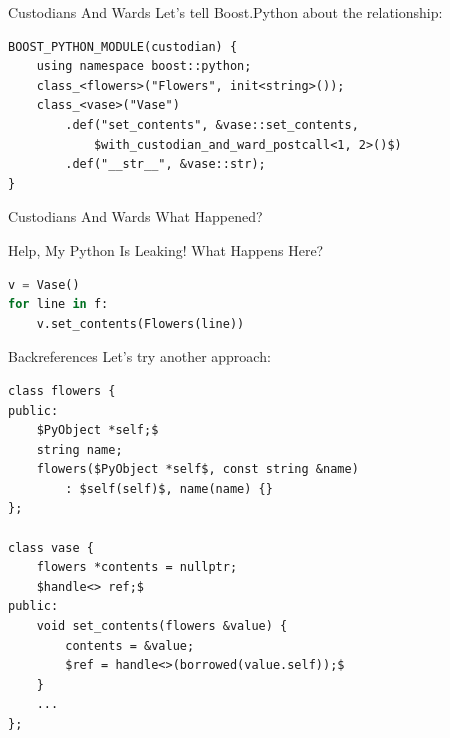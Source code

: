 \documentclass{beamer}
\begin{document}
\begin{frame}[fragile=singleslide]{Custodians And Wards}
  Let's tell Boost.Python about the relationship:
  \begin{lstlisting}[language={[extra]c++}]
BOOST_PYTHON_MODULE(custodian) {
    using namespace boost::python;
    class_<flowers>("Flowers", init<string>());
    class_<vase>("Vase")
        .def("set_contents", &vase::set_contents,
            $with_custodian_and_ward_postcall<1, 2>()$)
        .def("__str__", &vase::str);
}
  \end{lstlisting}
\end{frame}

\begin{frame}{Custodians And Wards}
  What Happened?

  \begin{figure}
  \end{figure}
\end{frame}

\begin{frame}[fragile=singleslide]{Help, My Python Is Leaking!}
  What Happens Here?
  \begin{lstlisting}[language=python]
v = Vase()
for line in f:
    v.set_contents(Flowers(line))
  \end{lstlisting}
\end{frame}

\begin{frame}[fragile=singleslide]{Backreferences}
  Let's try another approach:
  \begin{lstlisting}[language={[extra]c++}]
class flowers {
public:
    $PyObject *self;$
    string name;
    flowers($PyObject *self$, const string &name)
        : $self(self)$, name(name) {}
};

class vase {
    flowers *contents = nullptr;
    $handle<> ref;$
public:
    void set_contents(flowers &value) {
        contents = &value;
        $ref = handle<>(borrowed(value.self));$
    }
    ...
};
  \end{lstlisting}
\end{frame}
\end{document}
